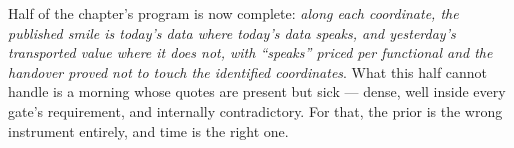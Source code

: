 Half of the chapter's program is now complete: \emph{along each
coordinate, the published smile is today's data where today's data
speaks, and yesterday's transported value where it does not, with
``speaks'' priced per functional and the handover proved not to
touch the identified coordinates}.  What this half cannot handle is
a morning whose quotes are present but sick --- dense, well inside
every gate's requirement, and internally contradictory.  For that,
the prior is the wrong instrument entirely, and time is the right
one.
